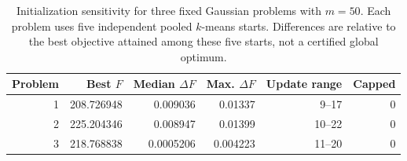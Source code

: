 \begin{table}[htbp]
\centering
\small
\caption{Initialization sensitivity for three fixed Gaussian problems with $m=50$. Each problem uses five independent pooled $k$-means starts. Differences are relative to the best objective attained among these five starts, not a certified global optimum.}
\label{tab:gaussian-multistart}
\begin{tabular}{rrrrrr}
\toprule
Problem & Best $F$ & Median $\Delta F$ & Max. $\Delta F$ & Update range & Capped \\
\midrule
1 & 208.726948 & 0.009036 & 0.01337 & 9--17 & 0 \\
2 & 225.204346 & 0.008947 & 0.01399 & 10--22 & 0 \\
3 & 218.768838 & 0.0005206 & 0.004223 & 11--20 & 0 \\
\bottomrule
\end{tabular}
\end{table}
